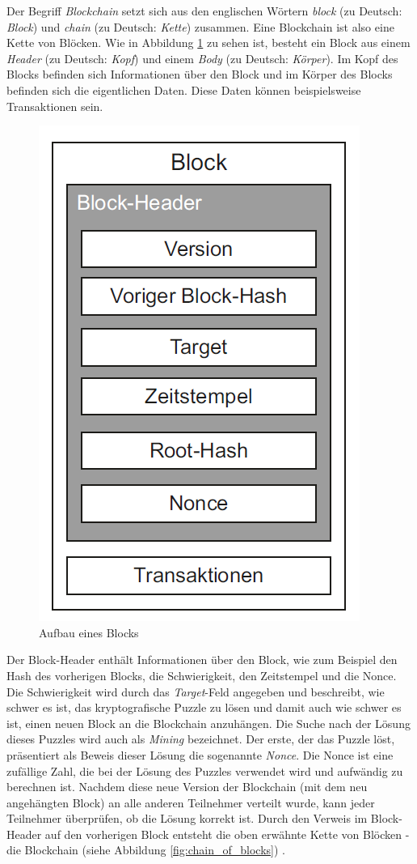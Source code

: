 Der Begriff \textit{Blockchain} setzt sich aus den englischen Wörtern \textit{block} (zu Deutsch: \textit{Block}) und \textit{chain} (zu Deutsch: \textit{Kette}) zusammen. Eine Blockchain ist also eine Kette von Blöcken. Wie in Abbildung \ref{fig:block} zu sehen ist, besteht ein Block aus einem \textit{Header} (zu Deutsch: \textit{Kopf}) und einem \textit{Body} (zu Deutsch: \textit{Körper}). Im Kopf des Blocks befinden sich Informationen über den Block und im Körper des Blocks befinden sich die eigentlichen Daten. Diese Daten können beispielsweise Transaktionen sein.

\begin{figure}[H]
    \centering
    \includegraphics[width=0.4\linewidth]{images/blockchain_block.png}
    \caption{Aufbau eines Blocks \parencite[S. 11]{Fill_BlockchainGrundlagen}}
    \label{fig:block}
\end{figure}


\noindent Der Block-Header enthält Informationen über den Block, wie zum Beispiel den Hash des vorherigen Blocks, die Schwierigkeit, den Zeitstempel und die Nonce. Die Schwierigkeit wird durch das \textit{Target}-Feld angegeben und beschreibt, wie schwer es ist, das kryptografische Puzzle zu lösen und damit auch wie schwer es ist, einen neuen Block an die Blockchain anzuhängen. Die Suche nach der Lösung dieses Puzzles wird auch als \textit{Mining} bezeichnet. Der erste, der das Puzzle löst, präsentiert als Beweis dieser Lösung die sogenannte \textit{Nonce}. Die Nonce ist eine zufällige Zahl, die bei der Lösung des Puzzles verwendet wird und aufwändig zu berechnen ist. Nachdem diese neue Version der Blockchain (mit dem neu angehängten Block) an alle anderen Teilnehmer verteilt wurde, kann jeder Teilnehmer überprüfen, ob die Lösung korrekt ist. Durch den Verweis im Block-Header auf den vorherigen Block entsteht die oben erwähnte Kette von Blöcken - die Blockchain (siehe Abbildung \ref{fig:chain_of_blocks}) \parencite[S. 10-12]{Fill_BlockchainGrundlagen}.

